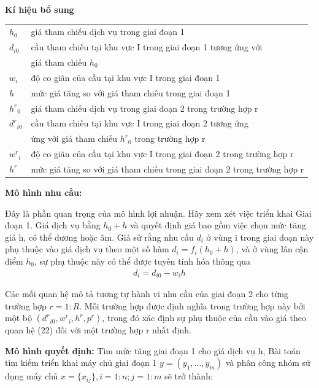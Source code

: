 \documentclass[a4paper]{article}
\begin{document}
\begin{itemize}
        \textbf{Kí hiệu bổ sung}
        
        \begin{tabular}{ll}
            \toprule
            $h_0$&giá tham chiếu dịch vụ trong giai đoạn 1\\
            $d_{i0}$& cầu tham chiếu tại khu vực I trong giai đoạn 1 tương ứng với \\
            &giá tham chiếu $h_0$\\
            $w_i$&độ co giãn của cầu tại khu vực I trong giai đoạn 1\\
            $h$& mức giá tăng so với giá tham chiếu trong giai đoạn 1\\
            ${h^r}_0$ & giá tham chiếu dịch vụ trong giai đoạn 2 trong trường hợp r\\
            ${d^r}_{i0}$ & cầu tham chiếu tại khu vực I trong giai đoạn 2 tương ứng\\
            &ứng với giá tham chiếu ${h^r}_0$ trong trường hợp r\\
            ${w^r}_i$ & độ co giãn của cầu tại khu vực I trong giai đoạn 2 trong trường hợp r\\
            $h^r$ & mức giá tăng so với giá tham chiếu trong giai đoạn 2 trong trường hợp r\\
            \bottomrule
        \end{tabular}

        \textbf{Mô hình nhu cầu:}

        Đây là phần quan trọng của mô hình lợi nhuận. Hãy xem xét việc triển khai Giai đoạn 1. 
        Giá dịch vụ bằng $h_0+h$ và quyết định giá bao gồm việc chọn mức tăng giá h, có thể dương hoặc âm. 
        Giả sử rằng nhu cầu $d_i$ ở vùng i trong giai đoạn này phụ thuộc vào giá dịch vụ theo một số hàm
        $d_i=f_i(h_0+h)$, và ở vùng lân cận điểm $h_0$, sự phụ thuộc này có thể được tuyến tính hóa thông qua
        \begin{gather}
            d_i=d_{i0} - w_ih
        \end{gather}

        Các mối quan hệ mô tả tương tự hành vi nhu cầu của giai đoạn 2 cho từng trường hợp 
        $r=1:R$. Mỗi trường hợp được định nghĩa trong trường hợp này bởi một bộ
        $({d^r}_{i0}, {w^r}_i, h^r, p^r)$, trong đó xác định sự phụ thuộc của cầu vào giá theo quan hệ (22) đối với một trường hợp r nhất định.

        \textbf{Mô hình quyết định:} Tìm mức tăng giai đoạn 1 cho giá dịch vụ h, Bài toán tìm kiếm triển khai máy chủ giai đoạn 1 
        $y = (y_1,\dotsc,y_m)$ và phân công nhóm sử dụng máy chủ $x=\{x_{ij}\},i=1:n; j=1:m$ sẽ trở thành:


\end{itemize}
\end{document}

